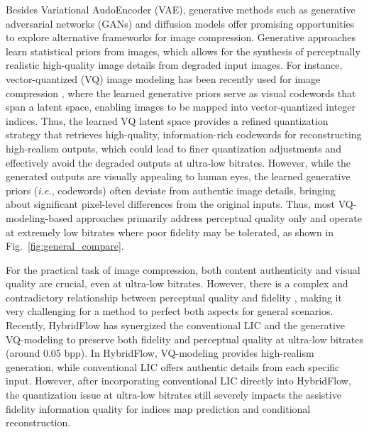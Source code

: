 Besides Variational AudoEncoder (VAE), generative methods such as generative adversarial networks (GANs) \cite{goodfellow2014generative, mirza2014conditional, radford2015unsupervised, isola2017image} and diffusion models \cite{dhariwal2021diffusion, ho2020denoising, rombach2022high, li2024pruning, shen2024} offer promising opportunities to explore alternative frameworks for image compression. Generative approaches learn statistical priors from images, which allows for the synthesis of perceptually realistic high-quality image details from degraded input images. For instance, vector-quantized (VQ) image modeling \cite{van2017neural,esser2021taming} has been recently used for image compression \cite{jia2024generative, vqganmasiwei, WACV2024}, where the learned generative priors serve as visual codewords that span a latent space, enabling images to be mapped into vector-quantized integer indices. 
Thus, the learned VQ latent space provides a refined quantization strategy that retrieves high-quality, information-rich codewords for reconstructing high-realism outputs, which could lead to finer quantization adjustments and effectively avoid the degraded outputs at ultra-low bitrates. However, while the generated outputs are visually appealing to human eyes, the learned generative priors (\textit{i.e.}, codewords) often deviate from authentic image details, bringing about significant pixel-level differences from the original inputs. Thus, most VQ-modeling-based approaches \cite{jia2024generative, vqganmasiwei} primarily address perceptual quality only and operate at extremely low bitrates where poor fidelity may be tolerated, as shown in Fig.~\ref{fig:general_compare}. 

For the practical task of image compression, both content authenticity and visual quality are crucial, even at ultra-low bitrates. However, there is a complex and contradictory relationship between perceptual quality and fidelity \cite{blau2018perception}, making it very challenging for a method to perfect both aspects for general scenarios. Recently, HybridFlow \cite{lu2024hybridflow} has synergized the conventional LIC and the generative VQ-modeling to preserve both fidelity and perceptual quality at ultra-low bitrates (around 0.05 bpp). In HybridFlow, VQ-modeling provides high-realism generation, while conventional LIC offers authentic details from each specific input. However, after incorporating conventional LIC directly into HybridFlow, the quantization issue at ultra-low bitrates still severely impacts the assistive fidelity information quality for indices map prediction and conditional reconstruction. 

